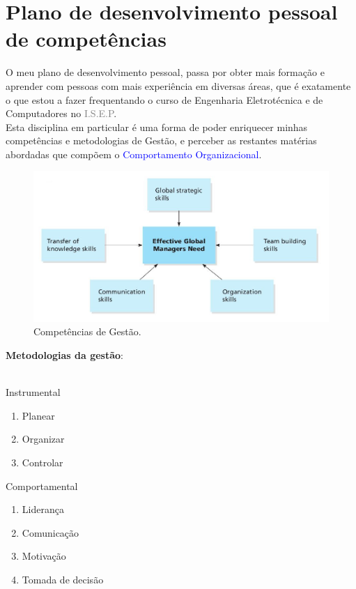 \section{Plano de desenvolvimento pessoal de competências}
\qquad O meu plano de desenvolvimento pessoal, passa por obter mais formação e aprender com pessoas com mais experiência em diversas áreas, que é exatamente o que estou a fazer frequentando o curso de Engenharia Eletrotécnica e de Computadores no \textcolor{gray}{I.S.E.P}.\\
Esta disciplina em particular é uma forma de poder enriquecer minhas competências e metodologias de Gestão, e perceber as restantes matérias abordadas que compõem o \textcolor{blue}{Comportamento Organizacional}.\\
\begin{minipage}{10.3cm}
\begin{figure}[H]
	\flushleft
	\includegraphics[scale=0.3]{"./image/Skills/Managerial Skills for the Global Marketplace.jpg"}
	\caption{Competências de Gestão. \cite{book_6}}
\end{figure}
\end{minipage}
\begin{minipage}{12cm}
	\textbf{Metodologias da gestão}: \cite{book_9}\\
	\\
	\begin{minipage}{3.1cm}
		Instrumental
		\begin{enumerate}
			\setlength\itemsep{-0.3em}
			\item Planear
			\item Organizar
			\item Controlar\\
		\end{enumerate}
	\end{minipage}
	\begin{minipage}{5cm}
		Comportamental
		\begin{enumerate}
			\setlength\itemsep{-0.3em}
			\item Liderança
			\item Comunicação
			\item Motivação
			\item Tomada de decisão
		\end{enumerate}
	\end{minipage}
\end{minipage}
